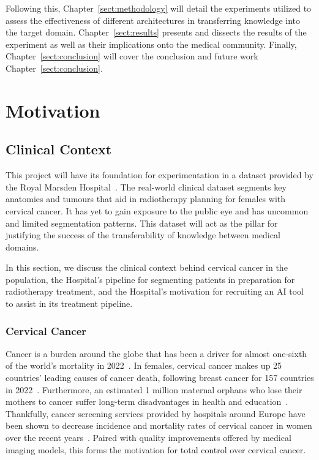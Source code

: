 \documentclass[11pt,twoside]{report}
\begin{document}
Following this, Chapter~\ref{sect:methodology} will detail the experiments utilized to assess the effectiveness of different architectures in transferring knowledge into the target domain. Chapter~\ref{sect:results} presents and dissects the results of the experiment as well as their implications onto the medical community. Finally, Chapter~\ref{sect:conclusion} will cover the conclusion and future work Chapter~\ref{sect:conclusion}.

\chapter{Motivation}\label{sect:motivation}

\section{Clinical Context}\label{sect:clinical-context}

This project will have its foundation for experimentation in a dataset provided by the Royal Marsden Hospital~\cite{AMLART-data}. The real-world clinical dataset segments key anatomies and tumours that aid in radiotherapy planning for females with cervical cancer. It has yet to gain exposure to the public eye and has uncommon and limited segmentation patterns. This dataset will act as the pillar for justifying the success of the transferability of knowledge between medical domains.

In this section, we discuss the clinical context behind cervical cancer in the population, the Hospital's pipeline for segmenting patients in preparation for radiotherapy treatment, and the Hospital's motivation for recruiting an AI tool to assist in its treatment pipeline. 

\subsection{Cervical Cancer}\label{sect:cervical-cancer}

Cancer is a burden around the globe that has been a driver for almost one-sixth of the world's mortality in 2022~\cite{Global-cancer-2022}. In females, cervical cancer makes up 25 countries' leading causes of cancer death, following breast cancer for 157 countries in 2022~\cite{Global-cancer-2022}. Furthermore, an estimated 1 million maternal orphans who lose their mothers to cancer suffer long-term disadvantages in health and education~\cite{Guida2022}. Thankfully, cancer screening services provided by hospitals around Europe have been shown to decrease incidence and mortality rates of cervical cancer in women over the recent years~\cite{Global-cancer-2022}. Paired with quality improvements offered by medical imaging models, this forms the motivation for total control over cervical cancer.
\end{document}
